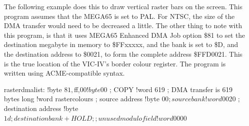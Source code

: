 The following example does this to draw vertical raster bars on the screen.
This program assumes that the MEGA65 is set to PAL.  For NTSC, the size of the DMA transfer
would need to be decreased a little.  The other thing to note with this program, is that
it uses MEGA65 Enhanced DMA Job option \$81 to set the destination megabyte in memory to
\$FFxxxxx, and the bank is set to \$D, and the destination address to \$0021, to form the
complete address \$FFD0021.  This is the true location of the VIC-IV's border colour register.
The program is written using ACME-compatible syntax.


\begin{screenoutput}
rasterdmalist:
	!byte $81,$ff,$00
	!byte $00 		; COPY
	!word 619 		; DMA transfer is 619 bytes long
	!word rastercolours	; source address
	!byte $00               ; source bank
	!word $0020		; destination address
	!byte $1d               ; destination bank + HOLD
	;; unused modulo field
	!word $0000
\end{screenoutput}

